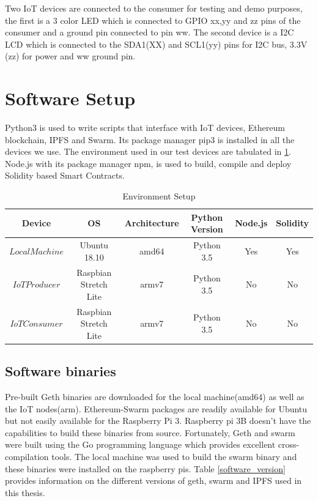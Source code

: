\documentclass[11pt,openright]{report}
\begin{document}
Two IoT devices are connected to the consumer for testing and demo purposes, the first is a 3 color LED which is connected to GPIO xx,yy and zz pins of the consumer and a ground pin connected to pin ww. The second device is a I2C LCD which is connected to the SDA1(XX) and SCL1(yy) pins for I2C bus, 3.3V (zz) for power and ww ground pin.


\section{Software Setup}
Python3 is used to write scripts that interface with IoT devices, Ethereum blockchain, IPFS and Swarm. Its package manager pip3 is installed in all the devices we use. The environment used in our test devices are tabulated in \ref{environment_setup}. Node.js with its package manager npm, is used to build, compile and deploy Solidity based Smart Contracts. 

\begin{table}[!htbp]
	\renewcommand{\arraystretch}{1}
	\caption{Environment Setup}
	\label{environment_setup}
	\centering
	\begin{tabular}{|c|c|c|c|c|c|}
		\hline
		\bfseries Device & \bfseries OS & \bfseries Architecture & \bfseries Python Version & \bfseries Node.js & \bfseries Solidity\\
		\hline\hline
		$Local Machine$ & Ubuntu 18.10 & amd64 & Python 3.5 &  Yes & Yes\\ \hline
		$IoT Producer$ & Raspbian Stretch Lite & armv7 & Python 3.5 &  No & No\\ \hline
		$IoT Consumer$ & Raspbian Stretch Lite & armv7 & Python 3.5 &  No & No\\ \hline
	\end{tabular}
\end{table}

\subsection{Software binaries}
Pre-built Geth binaries are downloaded for the local machine(amd64) as well as the IoT nodes(arm). Ethereum-Swarm packages are readily available for Ubuntu but not easily available for the Raspberry Pi 3.
Raspberry pi 3B doesn't have the capabilities to build these binaries from source. 
Fortunately, Geth and swarm were built using the Go programming language which provides excellent cross-compilation tools. The local machine was used to build the swarm binary and these binaries were installed on the raspberry pis. Table \ref{software_version} provides information on the different versions of geth, swarm and IPFS used in this thesis.
\end{document}
